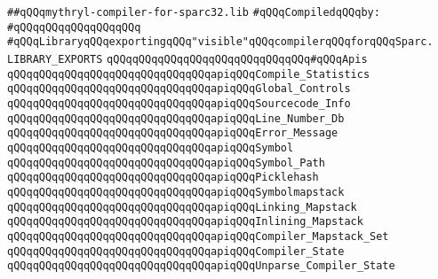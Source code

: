 \label{src/lib/core/compiler/mythryl-compiler-for-sparc32.lib}
\verb|##qQQqmythryl-compiler-for-sparc32.lib|\newline
\newline
\verb|#qQQqCompiledqQQqby:|\newline
\verb|#qQQqqQQqqQQqqQQqqQQq|\newline
\newline
\newline
\verb|#qQQqLibraryqQQqexportingqQQq"visible"qQQqcompilerqQQqforqQQqSparc.|\newline
\newline
\newline
\newline
\verb|LIBRARY_EXPORTS|\newline
\newline
\verb|qQQqqQQqqQQqqQQqqQQqqQQqqQQqqQQq#qQQqApis|\newline
\verb|qQQqqQQqqQQqqQQqqQQqqQQqqQQqqQQqapiqQQqCompile_Statistics|\newline
\verb|qQQqqQQqqQQqqQQqqQQqqQQqqQQqqQQqapiqQQqGlobal_Controls|\newline
\verb|qQQqqQQqqQQqqQQqqQQqqQQqqQQqqQQqapiqQQqSourcecode_Info|\newline
\verb|qQQqqQQqqQQqqQQqqQQqqQQqqQQqqQQqapiqQQqLine_Number_Db|\newline
\verb|qQQqqQQqqQQqqQQqqQQqqQQqqQQqqQQqapiqQQqError_Message|\newline
\verb|qQQqqQQqqQQqqQQqqQQqqQQqqQQqqQQqapiqQQqSymbol|\newline
\verb|qQQqqQQqqQQqqQQqqQQqqQQqqQQqqQQqapiqQQqSymbol_Path|\newline
\verb|qQQqqQQqqQQqqQQqqQQqqQQqqQQqqQQqapiqQQqPicklehash|\newline
\verb|qQQqqQQqqQQqqQQqqQQqqQQqqQQqqQQqapiqQQqSymbolmapstack|\newline
\verb|qQQqqQQqqQQqqQQqqQQqqQQqqQQqqQQqapiqQQqLinking_Mapstack|\newline
\verb|qQQqqQQqqQQqqQQqqQQqqQQqqQQqqQQqapiqQQqInlining_Mapstack|\newline
\verb|qQQqqQQqqQQqqQQqqQQqqQQqqQQqqQQqapiqQQqCompiler_Mapstack_Set|\newline
\verb|qQQqqQQqqQQqqQQqqQQqqQQqqQQqqQQqapiqQQqCompiler_State|\newline
\verb|qQQqqQQqqQQqqQQqqQQqqQQqqQQqqQQqapiqQQqUnparse_Compiler_State|\newline

